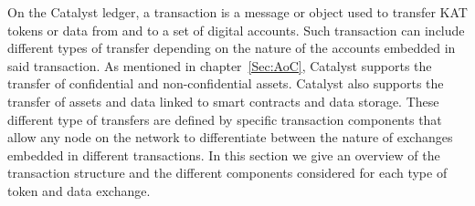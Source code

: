 On the Catalyst ledger, a transaction is a message or object used to transfer KAT tokens or data from and to a set of digital accounts. Such transaction can include different types of transfer depending on the nature of the accounts embedded in said transaction. As mentioned in chapter~\ref{Sec:AoC}, Catalyst supports the transfer of confidential and non-confidential assets. Catalyst also supports the transfer of assets and data linked to smart contracts and data storage. These different type of transfers are defined by specific transaction components that allow any node on the network to differentiate between the nature of exchanges embedded in different transactions. In this section we give an overview of the transaction structure and the different components considered for each type of token and data exchange.  
